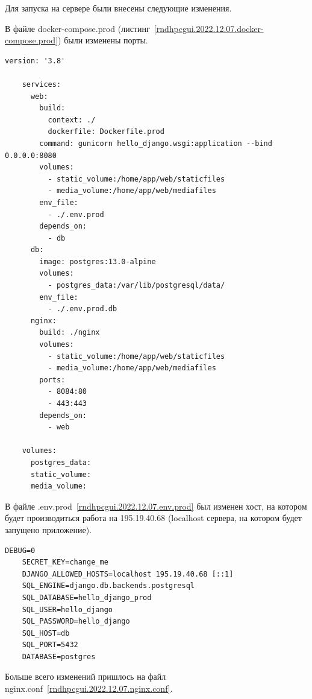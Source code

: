 \def\notedate{2022.12.07}
\def\currentauthor{Василян А.Р. (РК6-73Б)}


Для запуска на сервере были внесены следующие изменения.

	В файле \textsf{docker-compose.prod} (листинг~\ref{rndhpcgui.2022.12.07.docker-compose.prod}) были изменены порты.

\begin{lstlisting}[frame=single, label={rndhpcgui.2022.12.07.docker-compose.prod}, caption={Содержимое файла \textsf{docker-compose.prod.yml}}, language={docker-compose}] 
	version: '3.8'

	services:
	  web:
		build:
		  context: ./
		  dockerfile: Dockerfile.prod
		command: gunicorn hello_django.wsgi:application --bind 0.0.0.0:8080
		volumes:
		  - static_volume:/home/app/web/staticfiles
		  - media_volume:/home/app/web/mediafiles
		env_file:
		  - ./.env.prod
		depends_on:
		  - db
	  db:
		image: postgres:13.0-alpine
		volumes:
		  - postgres_data:/var/lib/postgresql/data/
		env_file:
		  - ./.env.prod.db
	  nginx:
		build: ./nginx
		volumes:
		  - static_volume:/home/app/web/staticfiles
		  - media_volume:/home/app/web/mediafiles
		ports:
		  - 8084:80
		  - 443:443
		depends_on:
		  - web
	
	volumes:
	  postgres_data:
	  static_volume:
	  media_volume:	
\end{lstlisting}

В файле \textsf{.env.prod}~\ref{rndhpcgui.2022.12.07.env.prod} был изменен хост, на котором будет производиться работа на 195.19.40.68 (localhost сервера, на котором будет запущено приложение).

\begin{lstlisting}[frame=single, label={rndhpcgui.2022.12.07.env.prod}, caption={Содержимое файла \textsf{.env.prod}}, language={aINIExample}] 
	DEBUG=0
	SECRET_KEY=change_me
	DJANGO_ALLOWED_HOSTS=localhost 195.19.40.68 [::1]
	SQL_ENGINE=django.db.backends.postgresql
	SQL_DATABASE=hello_django_prod
	SQL_USER=hello_django
	SQL_PASSWORD=hello_django
	SQL_HOST=db
	SQL_PORT=5432
	DATABASE=postgres
\end{lstlisting}

Больше всего изменений пришлось на файл \textsf{nginx.conf}~\ref{rndhpcgui.2022.12.07.nginx.conf}. 

